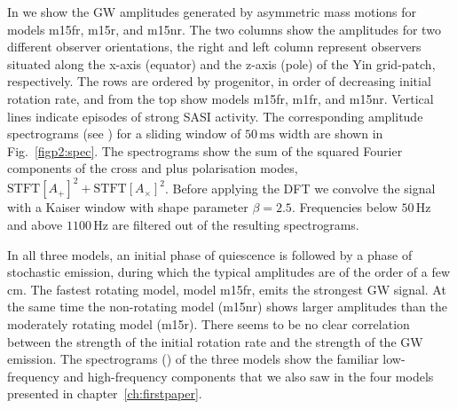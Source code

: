 In  we show the GW amplitudes generated by asymmetric mass motions for models m15fr, m15r, and m15nr.
The two columns show the amplitudes for two different observer orientations,
the right and left column represent observers situated along the x-axis (equator) and the z-axis (pole) of the Yin grid-patch,
respectively. The rows are ordered by progenitor, in order of decreasing initial rotation rate, and from the top
show models m15fr, m1fr, and m15nr. Vertical lines indicate episodes of strong SASI activity.
The corresponding amplitude spectrograms (see ) for a sliding window of $50 \, \mathrm{ms}$ width are shown 
in Fig.~\ref{figp2:spec}. The spectrograms show the sum of the squared Fourier
components of the cross and plus polarisation modes,
$\text{STFT}[{A_+}]^2 + \text{STFT}[{A_{\times}}]^2$. Before applying the
DFT we convolve the signal with a Kaiser window with shape parameter $\beta = 2.5$. Frequencies
below $50 \, \mathrm{Hz}$ and above $1100  \, \mathrm{Hz}$ are filtered out of the resulting spectrograms. 

In all three models, an initial phase of quiescence is followed by a phase of stochastic emission, 
during which the typical amplitudes are of the order of a few cm. The fastest rotating model, model m15fr, 
emits the strongest GW signal. 
At the same time the non-rotating model (m15nr) shows larger amplitudes than the moderately rotating model (m15r).
There seems to be no clear correlation between the strength of the initial rotation rate and the strength of the GW emission. 
The spectrograms () of the three models show the familiar low-frequency and high-frequency 
components that we also saw in the four models presented in chapter~\ref{ch:firstpaper}.

